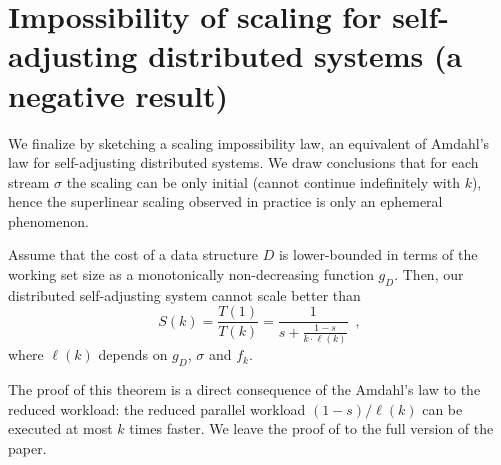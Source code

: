 













\section{Impossibility of scaling for self-adjusting distributed systems (a negative result)}


We finalize by sketching a scaling impossibility law, an equivalent of Amdahl's law for self-adjusting distributed systems. We draw conclusions that for each stream $\sigma$ the scaling can be only initial (cannot continue indefinitely with $k$), hence the superlinear scaling observed in practice is only an ephemeral phenomenon.


\begin{theorem}
	\label{thm:upper}
Assume that the cost of a data structure $D$ is lower-bounded in terms of the working set size as a monotonically non-decreasing function $g_D$. 
Then, our distributed self-adjusting system cannot scale better than
 \begin{displaymath}
    S(k) = \frac{T(1)}{T(k)} = \frac{1}{s + \frac{1-s}{k \cdot \ell(k)}} \enspace ,
  \end{displaymath}
  where $\ell(k)$ depends on $g_D$, $\sigma$ and $f_k$.
\end{theorem}

The proof of this theorem is a direct consequence of the Amdahl's law to the reduced workload: the reduced parallel workload $(1-s)/\ell(k)$ can be executed at most $k$ times faster.
We leave the proof of to the full version of the paper.
 

